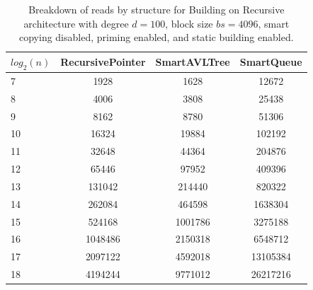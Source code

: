 \begin{table}[]
\centering
\begin{tabular}{|l|c|c|c|}
$log_2(n)$ & RecursivePointer & SmartAVLTree & SmartQueue \\ \hline
7 & 1928 & 1628 & 12672 \\ \hline
8 & 4006 & 3808 & 25438 \\ \hline
9 & 8162 & 8780 & 51306 \\ \hline
10 & 16324 & 19884 & 102192 \\ \hline
11 & 32648 & 44364 & 204876 \\ \hline
12 & 65446 & 97952 & 409396 \\ \hline
13 & 131042 & 214440 & 820322 \\ \hline
14 & 262084 & 464598 & 1638304 \\ \hline
15 & 524168 & 1001786 & 3275188 \\ \hline
16 & 1048486 & 2150318 & 6548712 \\ \hline
17 & 2097122 & 4592018 & 13105384 \\ \hline
18 & 4194244 & 9771012 & 26217216 \\ \hline
\end{tabular}
\caption{Breakdown of reads by structure for Building on Recursive architecture with degree $d=100$, block size $bs=4096$, smart copying disabled, priming enabled, and static building enabled.}
    \label{tab:reads_by_structure_build_d100_bs4096_copiesfalse_primetrue_staticinsertiontrue_ptrecursive_movetrue}
\end{table}

